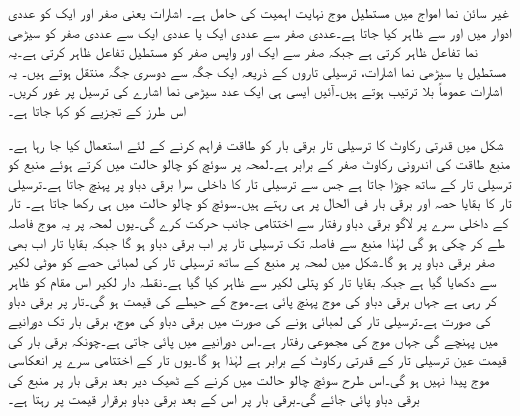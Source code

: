 غیر سائن نما امواج میں مستطیل موج نہایت اہمیت کی حامل ہے۔ اشارات یعنی صفر اور  ایک  کو عددی ادوار  میں  اور  سے ظاہر کیا جاتا ہے۔عددی صفر سے عددی ایک یا عددی ایک سے عددی صفر کو سیڑھی نما تفاعل ظاہر کرتی ہے جبکہ صفر سے ایک اور واپس صفر کو مستطیل تفاعل ظاہر کرتی ہے۔یہ مستطیل یا سیڑھی نما اشارات، ترسیلی تاروں کے ذریعہ ایک جگہ سے دوسری جگہ منتقل ہوتے ہیں۔ یہ اشارات عموماً بلا ترتیب ہوتے ہیں۔آئیں ایسی ہی ایک عدد سیڑھی نما اشارے کی ترسیل پر غور کریں۔ اس طرز کے تجزیے کو  کہا جاتا ہے۔

 شکل  میں  قدرتی رکاوٹ کا ترسیلی تار  برقی بار کو طاقت فراہم کرنے کے لئے استعمال کیا جا رہا ہے۔منبع طاقت کی اندرونی رکاوٹ صفر کے برابر ہے۔لمحہ  پر سوئچ کو چالو حالت میں کرتے ہوئے منبع کو ترسیلی تار کے ساتھ جوڑا جاتا ہے جس سے ترسیلی تار کا داخلی سرا  برقی دباو پر پہنچ جاتا ہے۔ترسیلی تار کا بقایا حصہ اور برقی بار فی الحال  پر ہی رہتے ہیں۔سوئچ کو چالو حالت میں ہی رکھا جاتا ہے۔ تار کے داخلی سرے پر لاگو برقی دباو رفتار  سے اختتامی جانب حرکت کرے گی۔یوں لمحہ  پر یہ موج  فاصلہ طے کر چکی ہو گی لہٰذا منبع سے فاصلہ  تک ترسیلی تار پر اب برقی دباو  ہو گا جبکہ بقایا تار اب بھی صفر برقی دباو پر ہو گا۔شکل  میں لمحہ  پر منبع کے ساتھ ترسیلی تار کی  لمبائی حصے کو موٹی لکیر سے دکھایا گیا ہے جبکہ بقایا تار کو پتلی لکیر سے ظاہر کیا گیا ہے۔نقطہ دار لکیر اس مقام کو ظاہر کر رہی ہے جہاں برقی دباو کی موج   پہنچ پائی ہے۔موج کے حیطے کی قیمت   ہو گی۔تار پر برقی دباو کی صورت  ہے۔ترسیلی تار کی لمبائی  ہونے کی صورت میں برقی دباو کی موج،  برقی بار تک  دورانیے میں پہنچے گی جہاں  موج کی مجموعی رفتار ہے۔اس دورانیے میں  پائی جاتی ہے۔چونکہ برقی بار کی قیمت عین ترسیلی تار کے قدرتی رکاوٹ کے  برابر ہے لہٰذا  ہو گا۔یوں تار کے اختتامی سرے پر انعکاسی موج پیدا نہیں ہو گی۔اس طرح سوئچ چالو حالت میں کرنے کے ٹھیک   دیر بعد برقی بار پر منبع کی برقی دباو  پائی جائے گی۔برقی بار پر اس کے بعد برقی دباو برقرار  قیمت پر رہتا ہے۔

